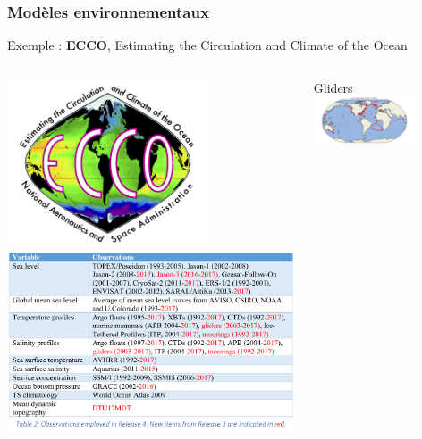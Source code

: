 \documentclass[9pt]{beamer}
\begin{document}
\begin{frame}
\frametitle{Modèles environnementaux}
\centering
Exemple : \textbf{ECCO}, Estimating the Circulation and Climate of the Ocean\\
    \begin{columns}
        \begin{column}{0.5\textwidth}
            \includegraphics[width=0.7\textwidth]{figures/ecco.png}
            \includegraphics[width=\textwidth]{figures/obs_ecco.png}
        \end{column}
        \begin{column}{0.5\textwidth}
            \centering
            Gliders\\
            \includegraphics[width=0.7\textwidth]{figures/gliders_distribution.png} \\

\end{column}
\end{columns}
\end{frame}
\end{document}
